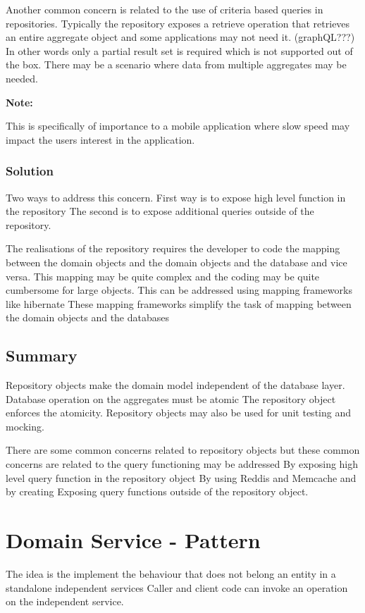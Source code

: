 \documentclass[a4paper, 11pt]{book}
\newenvironment{note}{
    \begin{siderule}
        \textbf{Note: }
        }{
    \end{siderule}
}
\begin{document}
    Another common concern is related to the use of criteria based queries in repositories.
    Typically the repository exposes a retrieve operation that retrieves an entire aggregate object and some applications may not need it. (graphQL???)
    In other words only a partial result set is required which is not supported out of the box.
    There may be a scenario where data from multiple aggregates may be needed.
    \begin{note}
    This is specifically of importance to a mobile application where slow speed may impact the users interest in the application.
    \end{note}

    \subsubsection{Solution}
    Two ways to address this concern.
    First way is to expose high level function in the repository
    The second is to expose additional queries outside of the repository.

    The realisations of the repository requires the developer to code the mapping between the domain objects and the domain objects and the database and vice versa.
    This mapping may be quite complex and the coding may be quite cumbersome for large objects.
    This can be addressed using mapping frameworks like hibernate
    These mapping frameworks simplify the task of mapping between the domain objects and the databases

    \subsection{Summary}
    Repository objects make the domain model independent of the database layer.
    Database operation on the aggregates must be atomic
    The repository object enforces the atomicity.
    Repository objects may also be used for unit testing and mocking.

    There are some common concerns related to repository objects but these common concerns are related to the query functioning may be addressed
    By exposing high level query function in the repository object
    By using Reddis and Memcache and by creating
    Exposing query functions outside of the repository object.


    \section{Domain Service - Pattern}
    The idea is the implement the behaviour that does not belong an entity in a standalone independent services
    Caller and client code can invoke an operation on the independent service.
\end{document}
